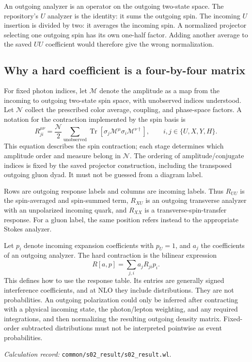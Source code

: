 \documentclass[11pt,a4paper]{article}
\newcommand{\tr}{\operatorname{Tr}}
\newcommand{\code}[1]{{\small\nolinkurl{#1}}}
\newcommand{\pathref}[1]{\par{\footnotesize\textit{Calculation record:} \code{#1}.}\par}
\begin{document}
An outgoing analyzer is an operator on the outgoing two-state space. The repository's $U$ analyzer is the identity: it sums the outgoing spin. The incoming $U$ insertion is divided by two: it averages the incoming spin. A normalized projector selecting one outgoing spin has its own one-half factor. Adding another average to the saved $UU$ coefficient would therefore give the wrong normalization.

\subsection{Why a hard coefficient is a four-by-four matrix}
For fixed photon indices, let $\mathcal M$ denote the amplitude as a map from the incoming to outgoing two-state spin space, with unobserved indices understood. Let $\mathcal N$ collect the prescribed color average, coupling, and phase-space factors. A notation for the contraction implemented by the spin basis is
\begin{equation}
 R^{\mu\nu}_{ji}=\frac{\mathcal N}{2}
 \sum_{\text{unobserved}}\tr\!\left[
 \sigma_j\mathcal M^\mu\sigma_i\mathcal M^{\nu\dagger}\right],
 \qquad i,j\in\{U,X,Y,H\}.
\end{equation}
This equation describes the spin contraction; each stage determines which amplitude order and measure belong in $\mathcal N$. The ordering of amplitude/conjugate indices is fixed by the saved projector construction, including the transposed outgoing gluon dyad. It must not be guessed from a diagram label.

Rows are outgoing response labels and columns are incoming labels. Thus $R_{UU}$ is the spin-averaged and spin-summed term, $R_{XU}$ is an outgoing transverse analyzer with an unpolarized incoming quark, and $R_{XX}$ is a transverse-spin-transfer response. For a gluon label, the same position refers instead to the appropriate Stokes analyzer.

Let $p_i$ denote incoming expansion coefficients with $p_U=1$, and $a_j$ the coefficients of an outgoing analyzer. The hard contraction is the bilinear expression
\begin{equation}
 R[a,p]=\sum_{j,i}a_jR_{ji}p_i.
\end{equation}
This defines how to use the response table. Its entries are generally signed interference coefficients, and at NLO they include distributions. They are not probabilities. An outgoing polarization could only be inferred after contracting with a physical incoming state, the photon/lepton weighting, and any required integrations, and then normalizing the resulting outgoing density matrix. Fixed-order subtracted distributions must not be interpreted pointwise as event probabilities.
\pathref{common/s02_result/s02_result.wl}
\end{document}
